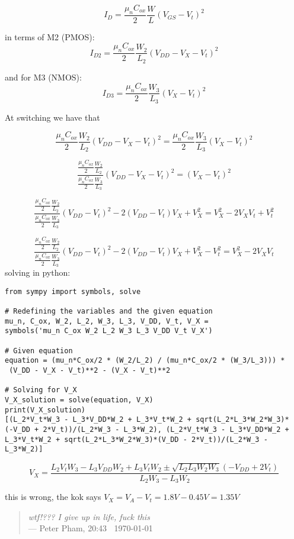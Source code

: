 $$I_D=\frac{\mu_nC_{ox}}{2}\frac{W}{L}\left(V_{GS}-V_{t}\right)^2$$

in terms of M2 (PMOS):
$$I_{D2}=\frac{\mu_nC_{ox}}{2}\frac{W_2}{L_2}\left(V_{DD}-V_X-V_{t}\right)^2$$

and for M3 (NMOS):
$$I_{D3}=\frac{\mu_nC_{ox}}{2}\frac{W_3}{L_3}\left(V_{X}-V_{t}\right)^2$$

At switching we have that 

$$\frac{\mu_nC_{ox}}{2}\frac{W_2}{L_2}\left(V_{DD}-V_X-V_{t}\right)^2=\frac{\mu_nC_{ox}}{2}\frac{W_3}{L_3}\left(V_{X}-V_{t}\right)^2$$

$$\frac{\frac{\mu_nC_{ox}}{2}\frac{W_2}{L_2}}{\frac{\mu_nC_{ox}}{2}\frac{W_3}{L_3}}\left(V_{DD}-V_X-V_{t}\right)^2=\left(V_{X}-V_{t}\right)^2$$

$$\frac{\frac{\mu_nC_{ox}}{2}\frac{W_2}{L_2}}{\frac{\mu_nC_{ox}}{2}\frac{W_3}{L_3}}\left(V_{DD}-V_{t}\right)^2-2\left(V_{DD}-V_{t}\right)V_X+V_X^2=V_{X}^2-2V_{X}V_{t}+V_{t}^2$$

$$\frac{\frac{\mu_nC_{ox}}{2}\frac{W_2}{L_2}}{\frac{\mu_nC_{ox}}{2}\frac{W_3}{L_3}}\left(V_{DD}-V_{t}\right)^2-2\left(V_{DD}-V_{t}\right)V_X+V_X^2-V_{t}^2=V_{X}^2-2V_{X}V_{t}$$
solving in python:
\begin{lstlisting}
from sympy import symbols, solve

# Redefining the variables and the given equation
mu_n, C_ox, W_2, L_2, W_3, L_3, V_DD, V_t, V_X = 
symbols('mu_n C_ox W_2 L_2 W_3 L_3 V_DD V_t V_X')

# Given equation
equation = (mu_n*C_ox/2 * (W_2/L_2) / (mu_n*C_ox/2 * (W_3/L_3))) *
 (V_DD - V_X - V_t)**2 - (V_X - V_t)**2

# Solving for V_X
V_X_solution = solve(equation, V_X)
print(V_X_solution)
[(L_2*V_t*W_3 - L_3*V_DD*W_2 + L_3*V_t*W_2 + sqrt(L_2*L_3*W_2*W_3)*
(-V_DD + 2*V_t))/(L_2*W_3 - L_3*W_2), (L_2*V_t*W_3 - L_3*V_DD*W_2 + 
L_3*V_t*W_2 + sqrt(L_2*L_3*W_2*W_3)*(V_DD - 2*V_t))/(L_2*W_3 - L_3*W_2)]
\end{lstlisting}
$$
V_X=\frac{L_2 V_t W_3-L_3 V_{D D} W_2+L_3 V_t W_2 \pm \sqrt{L_2 L_3 W_2 W_3}\left(-V_{D D}+2 V_t\right)}{L_2 W_3-L_3 W_2}
$$

this is wrong, the kok says $V_X=V_A-V_t=1.8V-0.45V=1.35V$ 

\begin{quote}
    \textit{wtf!??? I give up in life, fuck this }\\
    --- Peter Pham, 20:43 $\:$ \today 
\end{quote}

